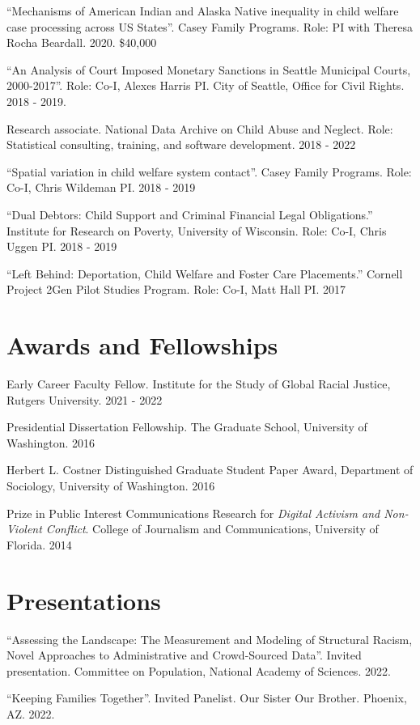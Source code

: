 \documentclass[margin,line]{res}
\begin{document}
\begin{resume}
``Mechanisms of American Indian and Alaska Native inequality in child welfare case processing across US States''. Casey Family Programs. Role: PI with Theresa Rocha Beardall. 2020. \$40,000 

``An Analysis of Court Imposed Monetary Sanctions in Seattle Municipal Courts, 2000-2017''. Role: Co-I, Alexes Harris PI. City of Seattle, Office for Civil Rights. 2018 - 2019. 

Research associate. National Data Archive on Child Abuse and Neglect. Role: Statistical consulting, training, and software development. 2018 - 2022

``Spatial variation in child welfare system contact''. Casey Family Programs. Role: Co-I, Chris Wildeman PI. 2018 - 2019

``Dual Debtors: Child Support and Criminal Financial Legal Obligations.''  Institute for Research on Poverty, University of Wisconsin. Role: Co-I, Chris Uggen PI. 2018 - 2019

``Left Behind: Deportation, Child Welfare and Foster Care Placements.'' Cornell Project 2Gen Pilot Studies Program. Role: Co-I, Matt Hall PI. 2017

\section{\sc Awards and Fellowships}

Early Career Faculty Fellow. Institute for the Study of Global Racial Justice, Rutgers University. 2021 - 2022

Presidential Dissertation Fellowship. The Graduate School, University of Washington. 2016

Herbert L. Costner Distinguished Graduate Student Paper Award, Department of Sociology, University of Washington. 2016

Prize in Public Interest Communications Research for \textit{Digital Activism and Non-Violent Conflict}. College of Journalism and Communications, University of Florida. 2014

\section{\sc Presentations}

``Assessing the Landscape: The Measurement and Modeling of Structural Racism, Novel Approaches to Administrative and Crowd-Sourced Data''. Invited presentation. Committee on Population, National Academy of Sciences. 2022.

``Keeping Families Together''. Invited Panelist. Our Sister Our Brother. Phoenix, AZ. 2022.


\end{resume}
\end{document}
